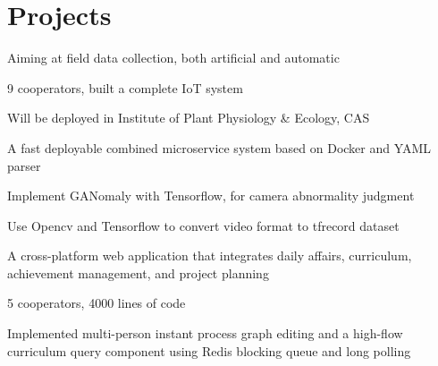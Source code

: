 \documentclass[]{deedy-resume-openfont}
\begin{document}
\begin{minipage}[t]{0.73\textwidth}
\section{Projects}
    \begin{tightemize}
        \item Aiming at field data collection, both artificial and automatic
        \item 9 cooperators, built a complete IoT system
		\item Will be deployed in Institute of Plant Physiology \& Ecology, CAS
		\item A fast deployable combined microservice system based on Docker and YAML parser
	\end{tightemize}
	\sectionsep

	\begin{tightemize}
		\item Implement GANomaly with Tensorflow, for camera abnormality judgment
		\item Use Opencv and Tensorflow to convert video format to tfrecord dataset
	\end{tightemize}
    \sectionsep
    
	\begin{tightemize}
		\item A cross-platform web application that integrates daily affairs, curriculum, achievement management, and project planning
		\item 5 cooperators, 4000 lines of code
		\item Implemented multi-person instant process graph editing and a high-flow curriculum query component using Redis blocking queue and long polling
	\end{tightemize}
	\sectionsep


\end{minipage}
\end{document}
